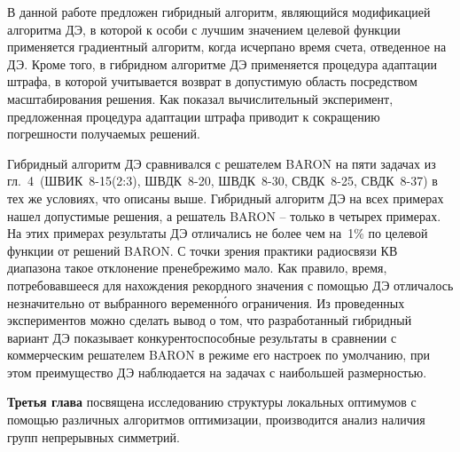 В данной работе предложен гибридный алгоритм, являющийся  модификацией алгоритма ДЭ, в которой к особи с лучшим значением целевой функции применяется градиентный алгоритм, когда 
исчерпано время счета, отведенное на ДЭ. 
Кроме того, в гибридном алгоритме ДЭ применяется процедура адаптации штрафа, в которой учитывается возврат в допустимую область посредством масштабирования решения. Как показал вычислительный эксперимент, предложенная процедура адаптации штрафа приводит к сокращению погрешности получаемых решений.

Гибридный алгоритм ДЭ сравнивался с решателем BARON на пяти задачах из гл.~4~(ШВИК~8-15(2:3), ШВДК~8-20, ШВДК~8-30, СВДК~8-25, СВДК~8-37) в тех же условиях, что описаны выше. Гибридный алгоритм ДЭ на всех примерах нашел допустимые решения, а решатель BARON -- только в четырех примерах. На этих примерах результаты ДЭ отличались не более чем на~1\% по целевой функции от решений BARON. С точки зрения практики радиосвязи КВ диапазона такое отклонение пренебрежимо мало. Как правило, время, потребовавшееся для нахождения рекордного значения с помощью ДЭ отличалось незначительно от выбранного веременн\'{о}го ограничения. Из проведенных экспериментов можно сделать вывод о том, что разработанный гибридный вариант ДЭ показывает конкурентоспособные результаты в сравнении с коммерческим решателем BARON в режиме его настроек по умолчанию, при этом преимущество ДЭ наблюдается на задачах с наибольшей размерностью.

{\textbf{Третья глава}} посвящена исследованию структуры локальных оптимумов с помощью различных алгоритмов оптимизации,
производится анализ наличия групп непрерывных симметрий.


